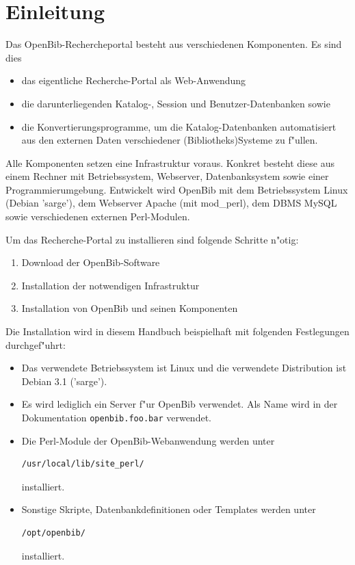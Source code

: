 \documentclass[11pt, twoside, a4paper, BCOR8mm, DIV12, bibtotoc,idxtotoc]{scrbook}
\begin{document}
\mainmatter

\chapter{Einleitung}

Das OpenBib-Rechercheportal besteht aus verschiedenen Komponenten. Es
sind dies

\begin{itemize}
\item das eigentliche Recherche-Portal als Web-Anwendung
\item die darunterliegenden Katalog-, Session und Benutzer-Datenbanken
  sowie
\item die Konvertierungsprogramme, um die Katalog-Datenbanken 
  automatisiert aus den externen Daten verschiedener
  (Bibliotheks)Systeme zu f"ullen.
\end{itemize}

Alle Komponenten setzen eine Infrastruktur voraus. Konkret besteht
diese aus einem Rechner mit Betriebssystem, Webserver, Datenbanksystem
sowie einer Programmierumgebung. Entwickelt wird OpenBib mit dem
Betriebssystem Linux (Debian 'sarge'), dem Webserver Apache (mit
mod\_perl), dem DBMS MySQL sowie verschiedenen externen Perl-Modulen.


Um das Recherche-Portal zu installieren sind folgende Schritte n"otig:
\begin{enumerate}
\item Download der OpenBib-Software
\item Installation der notwendigen Infrastruktur
\item Installation von OpenBib und seinen Komponenten
\end{enumerate}

Die Installation wird in diesem Handbuch beispielhaft mit folgenden
Festlegungen durchgef"uhrt:

\begin{itemize}
\item Das verwendete Betriebssystem ist Linux und die verwendete
  Distribution ist Debian 3.1 ('sarge').
\item Es wird lediglich ein Server f"ur OpenBib verwendet. Als Name
  wird in der Dokumentation \texttt{openbib.foo.bar} verwendet.
\item Die Perl-Module der OpenBib-Webanwendung werden unter
\begin{verbatim}
/usr/local/lib/site_perl/
\end{verbatim}
  installiert.
\item Sonstige Skripte, Datenbankdefinitionen oder Templates werden
  unter
\begin{verbatim}
/opt/openbib/
\end{verbatim}
  installiert.
\end{itemize}
\end{document}
